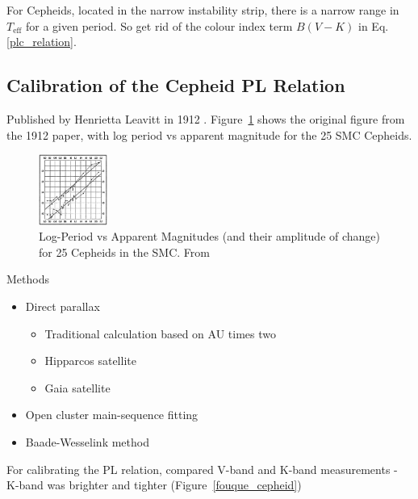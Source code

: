 \documentclass{spy}
\begin{document}
For Cepheids, located in the narrow instability strip, there is a narrow range in \(T_\mathrm{eff}\) for a given period. So get rid of the colour index term \(B(V-K)\) in Eq.\ref{plc_relation}. 



\subsection{Calibration of the Cepheid PL Relation}

Published by Henrietta Leavitt in 1912 \citep{leavittPeriods25Variable1912}. Figure~\ref{leavitt_period_luminosity_diagram} shows the original figure from the 1912 paper, with log period vs apparent magnitude for the 25 SMC Cepheids.

\begin{figure}[ht]
    \centering
    \includegraphics[width=0.2\textwidth]{leavitt_period_luminosity.eps}
    \caption{Log-Period vs Apparent Magnitudes (and their amplitude of change) for 25 Cepheids in the SMC. From \citet{leavittPeriods25Variable1912}}    \label{leavitt_period_luminosity_diagram}
\end{figure}

Methods
\begin{itemize}
    \item Direct parallax
        \begin{itemize}
        \item Traditional calculation based on AU times two
        \item Hipparcos satellite
        \item Gaia satellite
        \end{itemize}
    \item Open cluster main-sequence fitting
    \item Baade-Wesselink method
\end{itemize}

For calibrating the PL relation, \citet{fouqueNewCalibrationGalactic2007} compared V-band and K-band measurements - K-band was brighter and tighter (Figure~\ref{fouque_cepheid})
\end{document}
